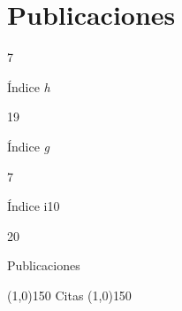 \documentclass[11pt,a4paper,]{awesome-cv}
\begin{document}
\section{Publicaciones}\label{publicaciones}

\begin{tcolorbox}[enhanced,
        on line, 
        boxsep=4pt, left=0pt,right=0pt,top=0pt,bottom=0pt,
        colframe=white,colback=violet,
        hyperurl={https://scholar.google.com/citations?user=XgNEpfgAAAAJ}]
  
\color{white}
  \begin{minipage}[c]{0.245\linewidth}
    \begin{center} 
      \begin{huge} 7 \end{huge}
     \begin{small} Índice \textit{h} \end{small} 
    \end{center} 
  \end{minipage} 
  \begin{minipage}[c]{0.245\linewidth}
    \begin{center} 
      \begin{huge} 19 \end{huge}
      \begin{small} Índice \textit{g} \end{small} 
    \end{center}
  \end{minipage} 
  \begin{minipage}[c]{0.245\linewidth}
    \begin{center} 
      \begin{huge} 7 \end{huge}
      \begin{small} Índice i10 \end{small} 
    \end{center}
  \end{minipage} 
  \begin{minipage}[c]{0.245\linewidth}
    \begin{center}  
      \begin{huge} 20 \end{huge}
      \begin{small} Publicaciones \end{small} 
    \end{center}
  \end{minipage} 
  
  \begin{center} \noindent\line(1,0){150} Citas \noindent\line(1,0){150} \end{center}
  

\end{tcolorbox}
\end{document}

